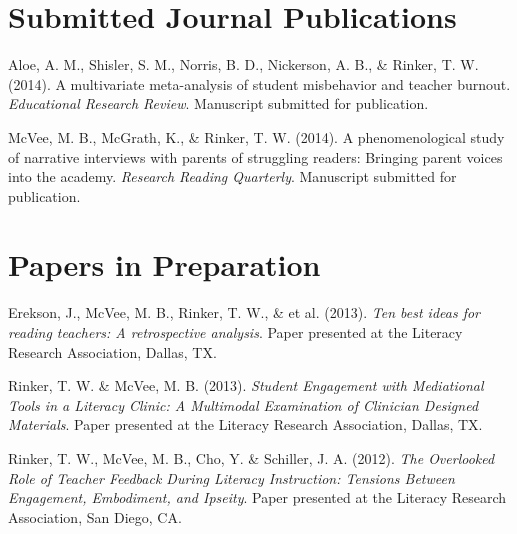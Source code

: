 
\section{Submitted Journal Publications}
\vspace{-.1275in}
\begin{bibsection}
    \item Aloe, A. M., Shisler, S. M., Norris, B. D., Nickerson, A. B., \& Rinker, T. W. (2014). A multivariate meta-analysis of student misbehavior and teacher burnout. \emph{Educational Research Review}. Manuscript submitted for publication.
    \item McVee, M. B., McGrath, K., \& Rinker, T. W. (2014). A phenomenological study of narrative interviews with parents of struggling readers: Bringing parent voices into the academy. \emph{Research Reading Quarterly}. Manuscript submitted for publication.
\end{bibsection}


\halfblankline

\section{Papers in Preparation}
\vspace{-.1in}
\begin{bibsection}

\item Erekson, J., McVee, M. B., Rinker, T. W., \& et al. (2013). \emph{Ten best ideas for reading teachers: A retrospective analysis}. Paper presented at the Literacy Research Association, Dallas, TX.

\item Rinker, T. W. \& McVee, M. B. (2013).  \emph{Student Engagement with Mediational Tools in a Literacy Clinic: A Multimodal Examination of Clinician Designed Materials}.  Paper presented at the Literacy Research Association, Dallas, TX.

\item Rinker, T. W., McVee, M. B., Cho, Y. \& Schiller, J. A. (2012).  \emph{The Overlooked Role of Teacher Feedback During Literacy Instruction: Tensions Between Engagement, Embodiment, and Ipseity}.  Paper presented at the Literacy Research Association, San Diego, CA.



\end{bibsection}

